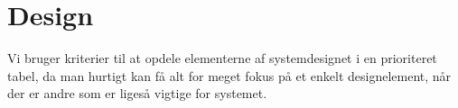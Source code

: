 \chapter{Design}
\label{chap:design}
Vi bruger kriterier til at opdele elementerne af systemdesignet i en prioriteret tabel, da man hurtigt kan få alt for meget fokus på et enkelt designelement, når der er andre som er ligeså vigtige for systemet.


